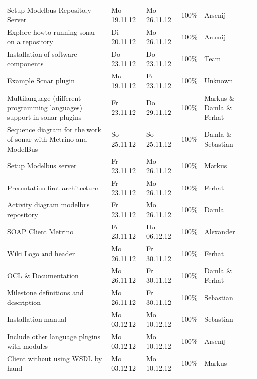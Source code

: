 \begin{longtable}{|p{6cm}|p{2.5cm}|p{2.5cm}|p{1.7cm}|p{1.8cm}|}
Setup Modelbus Repository Server & Mo 19.11.12 & Mo 26.11.12 & 100\% & Arsenij \\ 
Explore howto running sonar on a repository & Di 20.11.12 & Mo 26.11.12 & 100\% & Arsenij \\ 
Installation of software components & Do 23.11.12 & Do 23.11.12 & 100\% & Team \\ 
Example Sonar plugin                                                    & Mo 19.11.12 & Fr 23.11.12 & 100\%     & Unknown                 \\ 
Multilanguage (different programming languages) support in sonar plugins & Fr 23.11.12 & Do 29.11.12 & 100\%     & Markus  \&  Damla  \&  Ferhat \\
Sequence diagram for the work of sonar with Metrino and ModelBus        & So 25.11.12 & So 25.11.12 & 100\%     & Damla  \&  Sebastian    \\ 
Setup Modelbus server                                                   & Fr 23.11.12 & Mo 26.11.12 & 100\%     & Markus                  \\ 
Presentation first architecture                                         & Fr 23.11.12 & Mo 26.11.12 & 100\%     & Ferhat                  \\ 
Activity diagram modelbus repository                                    & Fr 23.11.12 & Mo 26.11.12 & 100\%     & Damla                   \\ 
SOAP Client Metrino                                                     & Fr 23.11.12 & Do 06.12.12 & 100\%     & Alexander               \\ 
Wiki Logo and header                                                    & Mo 26.11.12 & Fr 30.11.12 & 100\%     & Ferhat                  \\ 
OCL  \&  Documentation                                                  & Mo 26.11.12 & Fr 30.11.12 & 100\%     & Damla  \&  Ferhat       \\ 
Milestone definitions and description                                   & Mo 26.11.12 & Fr 30.11.12 & 100\%     & Sebastian               \\ 
Installation manual                                                     & Mo 03.12.12 & Mo 10.12.12 & 100\%     & Sebastian               \\ 
Include other language plugins with modules                             & Mo 03.12.12 & Mo 10.12.12 & 100\%     & Arsenij                 \\
Client without using WSDL by hand                                       & Mo 03.12.12 & Mo 10.12.12 & 100\%     & Markus                  \\ 

\end{longtable}
